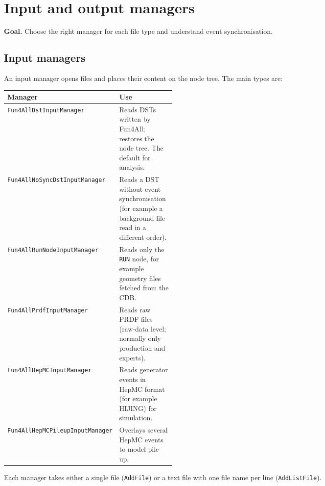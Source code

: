 \documentclass[11pt,letterpaper]{article}
\newcommand{\goal}[1]{\par\noindent\textbf{Goal.} #1\par}
\begin{document}
\section{Input and output managers}
\goal{Choose the right manager for each file type and understand event synchronisation.}

\subsection{Input managers}
An input manager opens files and places their content on the node tree. The main types are:
{\small\par\noindent\begin{tabularx}{\linewidth}{@{}>{\raggedright\arraybackslash}p{0.40\linewidth}X@{}}\toprule
Manager & Use \\\midrule
\texttt{Fun4AllDstInputManager} & Reads DSTs written by Fun4All; restores the node tree. The default for analysis. \\
\texttt{Fun4AllNoSyncDstInputManager} & Reads a DST without event synchronisation (for example a background file read in a different order). \\
\texttt{Fun4AllRunNodeInputManager} & Reads only the \texttt{RUN} node, for example geometry files fetched from the CDB. \\
\texttt{Fun4AllPrdfInputManager} & Reads raw PRDF files (raw-data level; normally only production and experts). \\
\texttt{Fun4AllHepMCInputManager} & Reads generator events in HepMC format (for example HIJING) for simulation. \\
\texttt{Fun4AllHepMCPileupInputManager} & Overlays several HepMC events to model pile-up. \\\bottomrule
\end{tabularx}}
\smallskip
Each manager takes either a single file (\texttt{AddFile}) or a text file with one file name per line (\texttt{AddListFile}).
\end{document}
